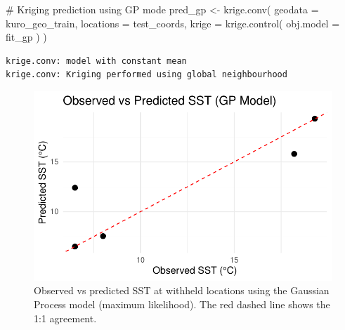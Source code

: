 \documentclass[
  11pt,
]{article}
\newenvironment{Shaded}{\begin{snugshade}}{\end{snugshade}}
\newcommand{\AttributeTok}[1]{\textcolor[rgb]{0.40,0.45,0.13}{#1}}
\newcommand{\CommentTok}[1]{\textcolor[rgb]{0.37,0.37,0.37}{#1}}
\newcommand{\FunctionTok}[1]{\textcolor[rgb]{0.28,0.35,0.67}{#1}}
\newcommand{\NormalTok}[1]{\textcolor[rgb]{0.00,0.23,0.31}{#1}}
\newcommand{\OtherTok}[1]{\textcolor[rgb]{0.00,0.23,0.31}{#1}}
\newcommand{\SpecialCharTok}[1]{\textcolor[rgb]{0.37,0.37,0.37}{#1}}
\begin{document}
\begin{Shaded}
\begin{Highlighting}[]
\CommentTok{\# Kriging prediction using GP mode}
\NormalTok{pred\_gp }\OtherTok{\textless{}{-}} \FunctionTok{krige.conv}\NormalTok{(}
  \AttributeTok{geodata =}\NormalTok{ kuro\_geo\_train,}
  \AttributeTok{locations =}\NormalTok{ test\_coords,}
  \AttributeTok{krige =} \FunctionTok{krige.control}\NormalTok{(}
    \AttributeTok{obj.model =}\NormalTok{ fit\_gp}
\NormalTok{  )}
\NormalTok{)}
\end{Highlighting}
\end{Shaded}

\begin{verbatim}
krige.conv: model with constant mean
krige.conv: Kriging performed using global neighbourhood 
\end{verbatim}

\begin{Shaded}
\end{Shaded}

\begin{figure}[H]

{\centering \includegraphics{project_files/figure-pdf/fig-gp_pred_scatter-1.pdf}

}

\caption{Observed vs predicted SST at withheld locations using the
Gaussian Process model (maximum likelihood). The red dashed line shows
the 1:1 agreement.}

\end{figure}%
\end{document}
